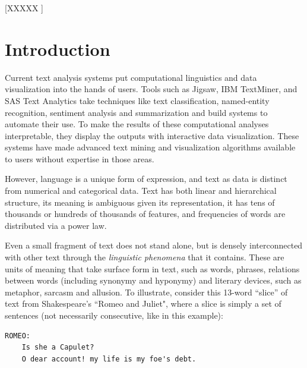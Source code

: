 \documentclass{sig-alternate}
\begin{document}

[XXXXX ]


\section{Introduction}
Current text analysis systems put computational linguistics and data visualization into the hands of users. Tools such as Jigsaw, IBM TextMiner, and SAS Text Analytics take techniques like text classification, named-entity recognition, sentiment analysis and summarization and build systems to automate their use. To make the results of these computational analyses interpretable, they display the outputs with interactive data visualization. These systems have made advanced text mining and visualization algorithms available to users without expertise in those areas.

However, language is a unique form of expression, and text as data is distinct from numerical and categorical data.  Text has both linear and hierarchical structure, its meaning is ambiguous given its representation, it has tens of thousands or hundreds of thousands of features, and frequencies of words are distributed via a power law.  

Even a small fragment of text does not stand alone, but is densely interconnected with other text through the \emph{linguistic phenomena} that it contains. These are units of meaning that take surface form in text, such as words, phrases, relations between words (including synonymy and hyponymy) and literary devices, such as metaphor, sarcasm and allusion. To illustrate, consider this 13-word ``slice'' of text from Shakespeare's ``Romeo and Juliet", where a slice is simply a set of sentences (not necessarily consecutive, like in this example):

\begin{verbatim}
ROMEO:
    Is she a Capulet?
    O dear account! my life is my foe's debt.
\end{verbatim}
\end{document}
